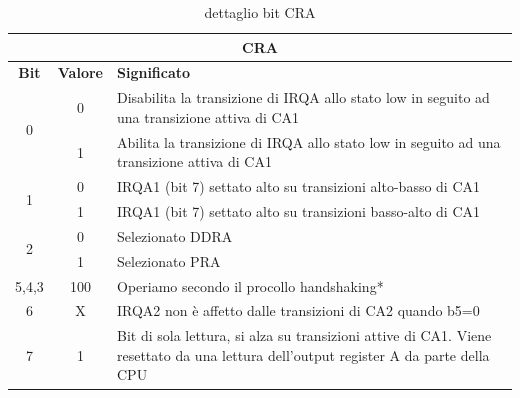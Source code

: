 \begin{table}[h!]
    \centering
    \begin{tabular}{|c|c|p{9cm}|}
    \hline
    \multicolumn{3}{|c|}{\textbf{CRA}} \\
    \hline
    \textbf{Bit} & \textbf{Valore} & \textbf{Significato} \\
    \hline
    \multirow{2}{*}{0} & 0 & Disabilita la transizione di IRQA allo stato low in seguito ad una transizione attiva di CA1 \\
                    & 1 &  Abilita la transizione di IRQA allo stato low in seguito ad una transizione attiva di CA1 \\
                    \hline
    \multirow{2}{*}{1} & 0 & IRQA1 (bit 7) settato alto su transizioni alto-basso di CA1 \\
                    & 1 & IRQA1 (bit 7) settato alto su transizioni basso-alto di CA1 \\
                    \hline
                    \multirow{2}{*}{2} & 0 & Selezionato DDRA \\
                    & 1 & Selezionato PRA \\
    \hline
    5,4,3 & 100 & Operiamo secondo il procollo handshaking* \\
                    
    \hline
    6 & X & IRQA2 non è affetto dalle transizioni di CA2 quando b5=0\\
    \hline
    7 & 1 & Bit di sola lettura, si alza su transizioni attive di CA1. Viene resettato da una lettura dell'output register A da parte della CPU \\
    \hline
\end{tabular}
    \caption{dettaglio bit CRA}
    \label{Tab:CRA}
\end{table}

